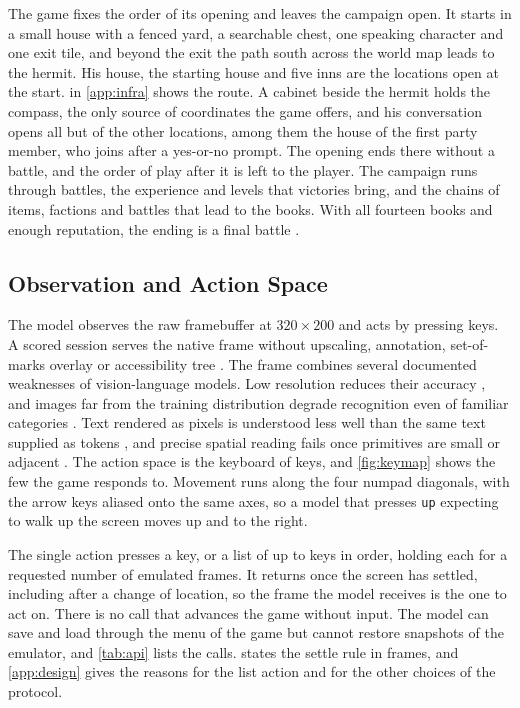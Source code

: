 \documentclass{article} %
\begin{document}
The game fixes the order of its opening and leaves the campaign open. It starts in a small house with a fenced yard, a searchable chest, one speaking character and one exit tile, and beyond the exit the path south across the world map leads to the hermit. His house, the starting house and five inns are the \MscenesOpenStart{} locations open at the start.  in \cref{app:infra} shows the route. A cabinet beside the hermit holds the compass, the only source of coordinates the game offers, and his conversation opens all but \MscenesClosedHermit{} of the other locations, among them the house of the first party member, who joins after a yes-or-no prompt. The opening ends there without a battle, and the order of play after it is left to the player. The campaign runs through battles, the experience and levels that victories bring, and the chains of items, factions and battles that lead to the books. With all fourteen books and enough reputation, the ending is a final battle \citep{bahamut2023walkthrough}.

\subsection{Observation and Action Space}
\label{sec:interface}

The model observes the raw framebuffer at $320\times200$ and acts by pressing
keys. A scored session serves the native frame without upscaling, annotation,
set-of-marks overlay or accessibility tree \citep[cf.][]{xie2024osworld}. The frame combines several documented weaknesses of vision-language models. Low resolution reduces their accuracy \citep{niu2025resolution}, and images far from the training distribution degrade recognition even of familiar categories \citep{lin2026oodbench}. Text rendered as pixels is understood less well than the same text supplied as
tokens \citep{liu2026vistabench}, and precise spatial reading fails once
primitives are small or adjacent
\citep{rahmanzadehgervi2024blind,wang2024spatialeval}. The action space is
the keyboard of \MkeyCodes{} keys, and \cref{fig:keymap} shows the few the game responds to. Movement runs along the four numpad diagonals, with the arrow
keys aliased onto the same axes, so a model that presses \texttt{up} expecting
to walk up the screen moves up and to the right.

The single action presses a key, or a list of up to \MmaxKeys{} keys in order, holding each for a requested number of emulated frames. It returns once the screen has settled, including after a change of location, so the frame the model receives is the one to act on. There is no call that advances the game without input. The model can save and load through the menu of the game but cannot restore snapshots of the emulator, and \cref{tab:api} lists the calls.  states the settle rule in frames, and \cref{app:design} gives the reasons for the list action and for the other choices of the protocol.
\end{document}
